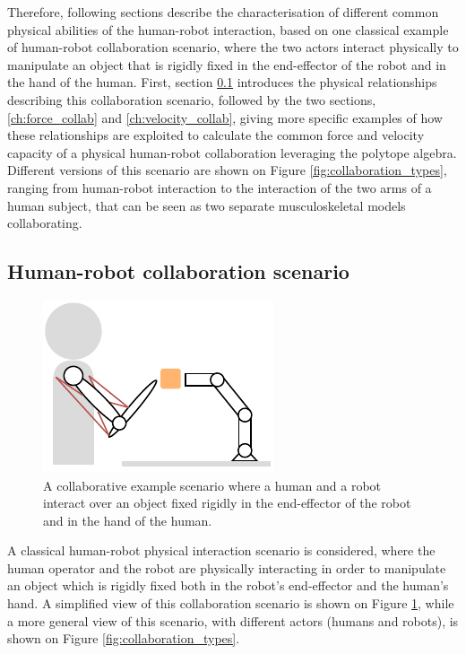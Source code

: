 Therefore, following sections describe the characterisation of different common physical abilities of the human-robot interaction, based on one classical example of human-robot collaboration scenario, where the two actors interact physically to manipulate an object that is rigidly fixed in the end-effector of the robot and in the hand of the human. First, section \ref{ch:which_metric_which} introduces the physical relationships describing this collaboration scenario, followed by the two sections, \ref{ch:force_collab} and \ref{ch:velocity_collab}, giving more specific examples of how these relationships are exploited to calculate the common force and velocity capacity of a physical human-robot collaboration leveraging the polytope algebra. 
Different versions of this scenario are shown on Figure \ref{fig:collaboration_types}, ranging from human-robot interaction to the interaction of the two arms of a human subject, that can be seen as two separate musculoskeletal models collaborating.


\subsection{Human-robot collaboration scenario}
\label{ch:which_metric_which}
\begin{figure}
    \centering
    \includegraphics{Chapters/imgs/example_inter.pdf}
    \caption{A collaborative example scenario where a human and a robot interact over an object fixed rigidly in the end-effector of the robot and in the hand of the human.}
    \label{fig:table_inter}
\end{figure}

A classical human-robot physical interaction scenario is considered, where the human operator and the robot are physically interacting in order to manipulate an object which is rigidly fixed both in the robot's end-effector and the human's hand. A simplified view of this collaboration scenario is shown on Figure \ref{fig:table_inter}, while a more general view of this scenario, with different actors (humans and robots), is shown on Figure \ref{fig:collaboration_types}.

